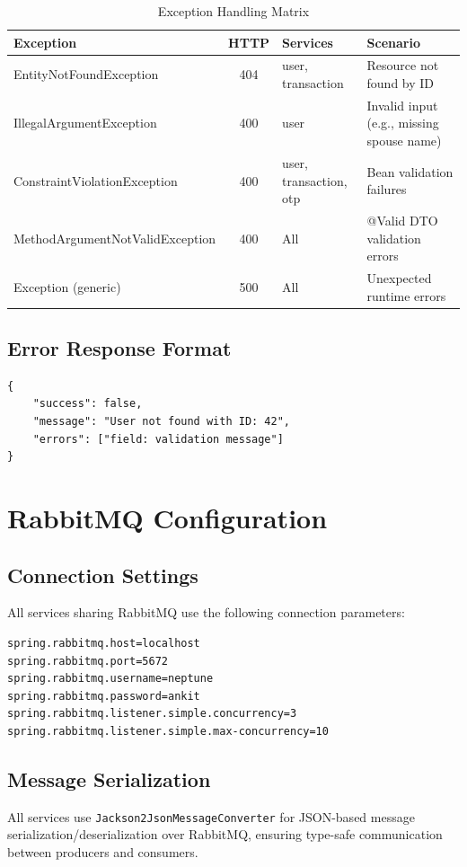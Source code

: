 \documentclass[12pt,a4paper]{report}
\begin{document}
\begin{table}[H]
\centering
\caption{Exception Handling Matrix}
\begin{tabularx}{\textwidth}{lclX}
\toprule
\textbf{Exception} & \textbf{HTTP} & \textbf{Services} & \textbf{Scenario} \\
\midrule
EntityNotFoundException & 404 & user, transaction & Resource not found by ID \\
IllegalArgumentException & 400 & user & Invalid input (e.g., missing spouse name) \\
ConstraintViolationException & 400 & user, transaction, otp & Bean validation failures \\
MethodArgumentNotValidException & 400 & All & @Valid DTO validation errors \\
Exception (generic) & 500 & All & Unexpected runtime errors \\
\bottomrule
\end{tabularx}
\end{table}

\section{Error Response Format}
\begin{lstlisting}[style=jsonstyle, caption={Standard Error Response}]
{
    "success": false,
    "message": "User not found with ID: 42",
    "errors": ["field: validation message"]
}
\end{lstlisting}

\chapter{RabbitMQ Configuration}

\section{Connection Settings}
All services sharing RabbitMQ use the following connection parameters:

\begin{lstlisting}[style=propstyle, caption={RabbitMQ Properties}]
spring.rabbitmq.host=localhost
spring.rabbitmq.port=5672
spring.rabbitmq.username=neptune
spring.rabbitmq.password=ankit
spring.rabbitmq.listener.simple.concurrency=3
spring.rabbitmq.listener.simple.max-concurrency=10
\end{lstlisting}

\section{Message Serialization}
All services use \texttt{Jackson2JsonMessageConverter} for JSON-based message serialization/deserialization over RabbitMQ, ensuring type-safe communication between producers and consumers.
\end{document}
